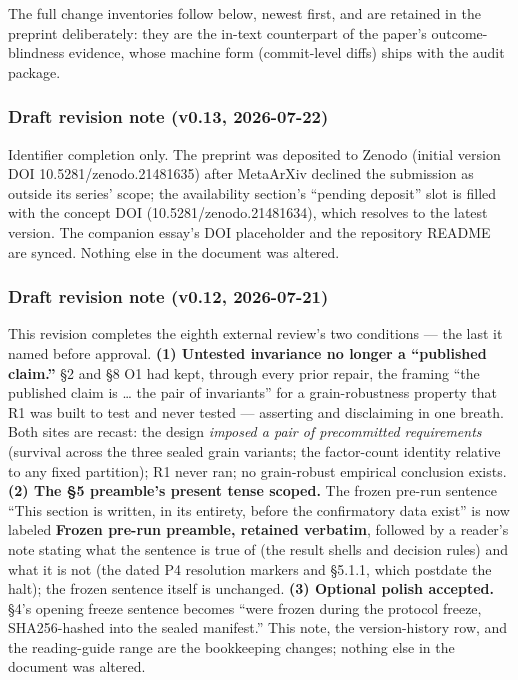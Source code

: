 The full change inventories follow below, newest first, and are retained in the preprint deliberately: they are the in-text counterpart of the paper's outcome-blindness evidence, whose machine form (commit-level diffs) ships with the audit package.

\subsubsection{Draft revision note (v0.13, 2026-07-22)}\label{draft-revision-note-v0.13-2026-07-22}

Identifier completion only. The preprint was deposited to Zenodo (initial version DOI 10.5281/zenodo.21481635) after MetaArXiv declined the submission as outside its series' scope; the availability section's ``pending deposit'' slot is filled with the concept DOI (10.5281/zenodo.21481634), which resolves to the latest version. The companion essay's DOI placeholder and the repository README are synced. Nothing else in the document was altered.

\subsubsection{Draft revision note (v0.12, 2026-07-21)}\label{draft-revision-note-v0.12-2026-07-21}

This revision completes the eighth external review's two conditions --- the last it named before approval. \textbf{(1) Untested invariance no longer a ``published claim.''} \S{}2 and \S{}8 O1 had kept, through every prior repair, the framing ``the published claim is \ldots{} the pair of invariants'' for a grain-robustness property that R1 was built to test and never tested --- asserting and disclaiming in one breath. Both sites are recast: the design \emph{imposed a pair of precommitted requirements} (survival across the three sealed grain variants; the factor-count identity relative to any fixed partition); R1 never ran; no grain-robust empirical conclusion exists. \textbf{(2) The \S{}5 preamble's present tense scoped.} The frozen pre-run sentence ``This section is written, in its entirety, before the confirmatory data exist'' is now labeled \textbf{Frozen pre-run preamble, retained verbatim}, followed by a reader's note stating what the sentence is true of (the result shells and decision rules) and what it is not (the dated P4 resolution markers and \S{}5.1.1, which postdate the halt); the frozen sentence itself is unchanged. \textbf{(3) Optional polish accepted.} \S{}4's opening freeze sentence becomes ``were frozen during the protocol freeze, SHA256-hashed into the sealed manifest.'' This note, the version-history row, and the reading-guide range are the bookkeeping changes; nothing else in the document was altered.

